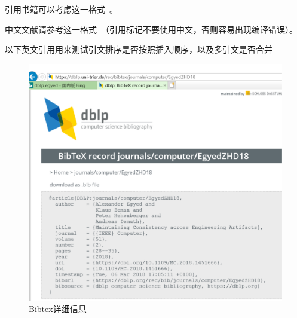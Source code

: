 引用书籍可以考虑这一格式~\cite{Pohl2010Requirements}。

中文文献请参考这一格式~\cite{cyg2006}（引用标记不要使用中文，否则容易出现编译错误）。

以下英文引用用来测试引文排序是否按照插入顺序，以及多引文是否合并~\cite{DBLP:journals/computer/EgyedZHD18, DBLP:journals/ml/TingZCZWZ19}

\begin{figure}[htb]
  \centering
  \includegraphics[width=5in]{figure/chapter7/bibtexDetail.pdf}
  \caption{Bibtex详细信息}\label{fig_bibtexDetailCH7}
\end{figure}
